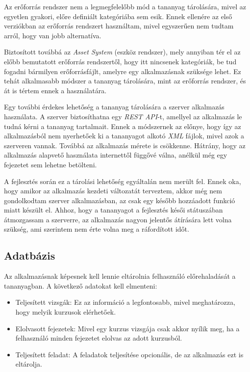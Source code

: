 \documentclass[12pt,a4paper]{article}
\newcommand{\xml}{\textit{XML}\xspace}
\begin{document}
	Az erőforrás rendszer nem a legmegfelelőbb mód a tananyag tárolására, mivel az egyetlen gyakori, előre definiált kategóriába sem esik. Ennek ellenére az első verziókban az erőforrás rendszert használtam, mivel egyszerűen nem tudtam arról, hogy van jobb alternatíva.
	
	Biztosított továbbá az \textit{Asset System} (eszköz rendszer), mely annyiban tér el az előbb bemutatott erőforrás rendszertől, hogy itt nincsenek kategóriák, be tud fogadni bármilyen erőforrásfájlt, amelyre egy alkalmazásnak szüksége lehet. Ez tehát alkalmasabb módszer a tananyag tárolására, mint az erőforrás rendszer, és át is tértem ennek a használatára.
	
	Egy további érdekes lehetőség a tananyag tárolására a szerver alkalmazás használata. A szerver biztosíthatna egy \textit{REST API}-t, amellyel az alkalmazás le tudná kérni a tananyag tartalmait. Ennek a módszernek az előnye, hogy így az alkalmazásból nem nyerhetőek ki a tananyagot alkotó \xml fájlok, mivel azok a szerveren vannak. Továbbá az alkalmazás mérete is csökkenne. Hátrány, hogy az alkalmazás alapvető használata internettől függővé válna, anélkül még egy fejezetet sem lehetne betölteni. 
	
	A fejlesztés során ez a tárolási lehetőség egyáltalán nem merült fel. Ennek oka, hogy amikor az alkalmazás kezdeti változatát terveztem, akkor még nem gondolkodtam szerver alkalmazásban, az csak egy később hozzáadott funkció miatt készült el. Ahhoz, hogy a tananyagot a fejlesztés késői státuszában átmozgassam a szerverre, az alkalmazás nagyon jelentős átírására lett volna szükség, ami szerintem nem érte volna meg a ráfordított időt. 
	
	\subsection{Adatbázis}
	
	Az alkalmazásnak képesnek kell lennie eltárolnia felhasználó előrehaladását a tananyagban. A következő adatokat kell elmenteni:
	
	\begin{itemize}
		\item Teljesített vizsgák: Ez az információ a legfontosabb, mivel meghatározza, hogy melyik kurzusok elérhetőek.
		\item Elolvasott fejezetek: Mivel egy kurzus vizsgája csak akkor nyílik meg, ha a felhasználó minden fejezetet elolvas az adott kurzusból.
		\item Teljesített feladat: A feladatok teljesítése opcionális, de az alkalmazás ezt is eltárolja.
	\end{itemize}
	
\end{document}
